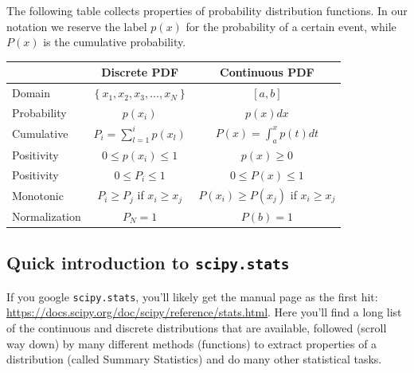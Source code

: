 \documentclass[%
oneside,                 %
final,                   %
10pt]{article}
\newenvironment{block_mdfboxadmon}[1][]{
\begin{block_mdfboxmdframed}[frametitle=#1]
}
{
\end{block_mdfboxmdframed}
}
\begin{document}
\begin{block_mdfboxadmon}[]

The following table collects properties of probability distribution functions.
In our notation we reserve the label $p(x)$ for the probability of a certain event,
while $P(x)$ is the cumulative probability. 




\begin{tabular}{lcc}
\hline
\multicolumn{1}{c}{  } & \multicolumn{1}{c}{ Discrete PDF } & \multicolumn{1}{c}{ Continuous PDF } \\
\hline
Domain        & $\left\{x_1, x_2, x_3, \dots, x_N\right\}$ & $[a,b]$                              \\
Probability   & $p(x_i)$                                   & $p(x)dx$                             \\
Cumulative    & $P_i=\sum_{l=1}^ip(x_l)$                   & $P(x)=\int_a^xp(t)dt$                \\
Positivity    & $0 \le p(x_i) \le 1$                       & $p(x) \ge 0$                         \\
Positivity    & $0 \le P_i \le 1$                          & $0 \le P(x) \le 1$                   \\
Monotonic     & $P_i \ge P_j$ if $x_i \ge x_j$             & $P(x_i) \ge P(x_j)$ if $x_i \ge x_j$ \\
Normalization & $P_N=1$                                    & $P(b)=1$                             \\
\hline
\end{tabular}


\noindent
\end{block_mdfboxadmon} %




\subsection{Quick introduction to  \texttt{scipy.stats} }
If you google \texttt{scipy.stats}, you'll likely get the manual page as the first hit: \href{{https://docs.scipy.org/doc/scipy/reference/stats.html}}{https://docs.scipy.org/doc/scipy/reference/stats.html}. Here you'll find a long list of the continuous and discrete distributions that are available, followed (scroll way down) by many different methods (functions) to extract properties of a distribution (called Summary Statistics) and do many other statistical tasks.
\end{document}
